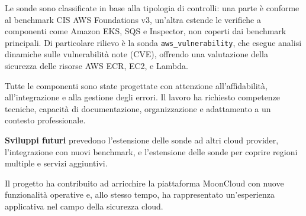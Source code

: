 \documentclass[11pt,a4paper]{article}
\begin{document}
Le sonde sono classificate in base alla tipologia di controlli: una parte è conforme al benchmark CIS AWS Foundations v3, un'altra estende le verifiche a componenti come Amazon EKS, SQS e Inspector, non coperti dai benchmark principali. Di particolare rilievo è la sonda \texttt{aws\_vulnerability}, che esegue analisi dinamiche sulle vulnerabilità note (CVE), offrendo una valutazione della sicurezza delle risorse AWS ECR, EC2, e Lambda.

Tutte le componenti sono state progettate con attenzione all'affidabilità, all'integrazione e alla gestione degli errori. Il lavoro ha richiesto competenze tecniche, capacità di documentazione, organizzazione e adattamento a un contesto professionale.

\vspace{1em}

\noindent
\textbf{Sviluppi futuri} prevedono l'estensione delle sonde ad altri cloud provider, l'integrazione con nuovi benchmark, e l'estensione delle sonde per coprire regioni multiple e servizi aggiuntivi.  

\vspace{2em}

\noindent
Il progetto ha contribuito ad arricchire la piattaforma MoonCloud con nuove funzionalità operative e, allo stesso tempo, ha rappresentato un'esperienza applicativa nel campo della sicurezza cloud.
\end{document}
